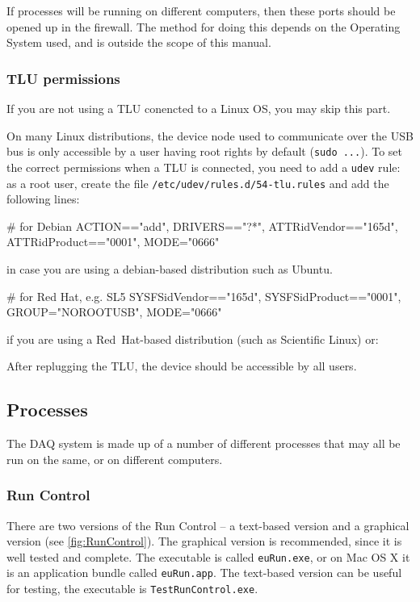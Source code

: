 If processes will be running on different computers,
then these ports should be opened up in the firewall.
The method for doing this depends on the Operating System used,
and is outside the scope of this manual.


\subsubsection{TLU permissions}\label{sec:TLUperm}
If you are not using a TLU conencted to a Linux OS, you may skip this part.

On many Linux distributions, the device node used to communicate over the USB bus is only
accessible by a user having root rights by default (\texttt{sudo ...}).
To set the correct permissions when a \gls{TLU} is
connected, you need to add a \texttt{udev} rule: as a root user, 
create the file \texttt{/etc/udev/rules.d/54-tlu.rules} and add
the following lines:
\begin{listing}
# for Debian
ACTION=="add", DRIVERS=="?*",  ATTR{idVendor}=="165d", ATTR{idProduct}=="0001",  MODE="0666"
\end{listing}
in case you are using a debian-based distribution such as Ubuntu.
\begin{listing}
# for Red Hat, e.g. SL5
SYSFS{idVendor}=="165d", SYSFS{idProduct}=="0001", GROUP="NOROOTUSB", MODE="0666"
\end{listing}
if you are using a Red~Hat-based distribution (such as Scientific Linux) or:

After replugging the \gls{TLU}, the device should be accessible by
all users.

\subsection{Processes}
The DAQ system is made up of a number of different processes that may all be run on the same,
or on different computers. 

\subsubsection{Run Control}
There are two versions of the Run Control -- a text-based version and a graphical version (see \autoref{fig:RunControl}).
The graphical version is recommended, since it is well tested and complete.
The executable is called \texttt{euRun.exe}, or on Mac OS X it is an application bundle called \texttt{euRun.app}.
The text-based version can be useful for testing, the executable is \texttt{TestRunControl.exe}.

